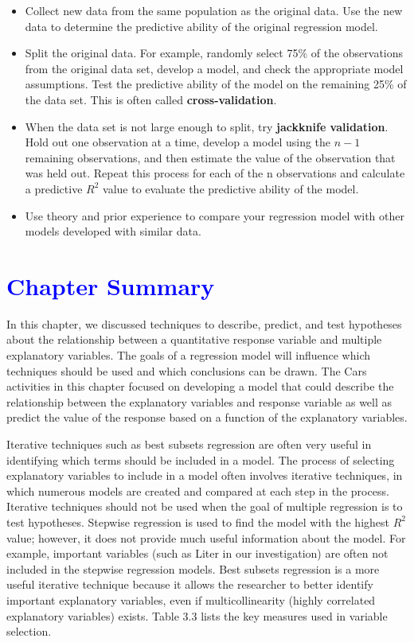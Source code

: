 \documentclass[
]{report}
\begin{document}
\begin{itemize}
\item
  Collect new data from the same population as the original data. Use the new data to determine the
  predictive ability of the original regression model.
\item
  Split the original data. For example, randomly select 75\% of the observations from the original data
  set, develop a model, and check the appropriate model assumptions. Test the predictive ability of the
  model on the remaining 25\% of the data set. This is often called \textbf{cross-validation}.
\item
  When the data set is not large enough to split, try \textbf{jackknife validation}. Hold out one observation at a time, develop a model using the \(\scriptstyle n-1\) remaining observations, and then estimate the value of the observation that was held out. Repeat this process for each of the n observations and calculate a predictive \(\scriptstyle {R}^2\) value to evaluate the predictive ability of the model.
\item
  Use theory and prior experience to compare your regression model with other models developed with
  similar data.
\end{itemize}

\hypertarget{section-38}{%
\section{\texorpdfstring{\textcolor{blue}{Chapter Summary}}{}}\label{section-38}}

In this chapter, we discussed techniques to describe, predict, and test hypotheses about the relationship between a quantitative response variable and multiple explanatory variables. The goals of a regression model will influence which techniques should be used and which conclusions can be drawn. The Cars activities in this chapter focused on developing a model that could describe the relationship between the explanatory variables and response variable as well as predict the value of the response based on a function of the explanatory variables.

Iterative techniques such as best subsets regression are often very useful in identifying which terms should be included in a model. The process of selecting explanatory variables to include in a model often involves iterative techniques, in which numerous models are created and compared at each step in the process. Iterative techniques should not be used when the goal of multiple regression is to test hypotheses. Stepwise regression is used to find the model with the highest \(\scriptstyle R^2\) value; however, it does not provide much useful information about the model. For example, important variables (such as Liter in our investigation) are often not included in the stepwise regression models. Best subsets regression is a more useful iterative technique because it allows the researcher to better identify important explanatory variables, even if multicollinearity (highly correlated explanatory variables) exists. Table 3.3 lists the key measures used in variable selection.
\end{document}
